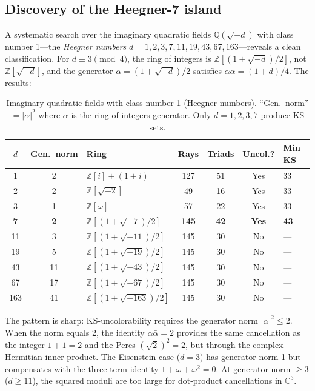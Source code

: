 \documentclass[12pt,a4paper]{article}
\newcommand{\C}{\mathbb{C}}
\newcommand{\Z}{\mathbb{Z}}
\newcommand{\Q}{\mathbb{Q}}
\begin{document}
\subsection{Discovery of the Heegner-7 island}\label{sec:heegner}

A systematic search over the imaginary quadratic fields $\Q(\sqrt{-d})$ with class number 1---the \emph{Heegner numbers} $d = 1, 2, 3, 7, 11, 19, 43, 67, 163$---reveals a clean classification. For $d \equiv 3 \pmod{4}$, the ring of integers is $\Z[(1+\sqrt{-d})/2]$, not $\Z[\sqrt{-d}]$, and the generator $\alpha = (1+\sqrt{-d})/2$ satisfies $\alpha\bar\alpha = (1+d)/4$. The results:

\begin{table}[ht]
\centering
\caption{Imaginary quadratic fields with class number 1 (Heegner numbers). ``Gen.\ norm'' $= |\alpha|^2$ where $\alpha$ is the ring-of-integers generator. Only $d = 1, 2, 3, 7$ produce KS sets.}
\label{tab:heegner}
\begin{tabular}{cclcccl}
\toprule
$d$ & Gen.\ norm & Ring & Rays & Triads & Uncol.? & Min KS \\
\midrule
1 & 2 & $\Z[i]+(1+i)$ & 127 & 51 & Yes & 33 \\
2 & 2 & $\Z[\sqrt{-2}]$ & 49 & 16 & Yes & 33 \\
3 & 1 & $\Z[\omega]$ & 57 & 22 & Yes & 33 \\
\textbf{7} & \textbf{2} & $\Z[(1+\sqrt{-7})/2]$ & \textbf{145} & \textbf{42} & \textbf{Yes} & \textbf{43} \\
11 & 3 & $\Z[(1+\sqrt{-11})/2]$ & 145 & 30 & No & --- \\
19 & 5 & $\Z[(1+\sqrt{-19})/2]$ & 145 & 30 & No & --- \\
43 & 11 & $\Z[(1+\sqrt{-43})/2]$ & 145 & 30 & No & --- \\
67 & 17 & $\Z[(1+\sqrt{-67})/2]$ & 145 & 30 & No & --- \\
163 & 41 & $\Z[(1+\sqrt{-163})/2]$ & 145 & 30 & No & --- \\
\bottomrule
\end{tabular}
\end{table}

The pattern is sharp: KS-uncolorability requires the generator norm $|\alpha|^2 \leq 2$. When the norm equals 2, the identity $\alpha\bar\alpha = 2$ provides the same cancellation as the integer $1+1=2$ and the Peres $(\sqrt{2})^2 = 2$, but through the complex Hermitian inner product. The Eisenstein case ($d = 3$) has generator norm 1 but compensates with the three-term identity $1 + \omega + \omega^2 = 0$. At generator norm $\geq 3$ ($d \geq 11$), the squared moduli are too large for dot-product cancellations in $\C^3$.
\end{document}
